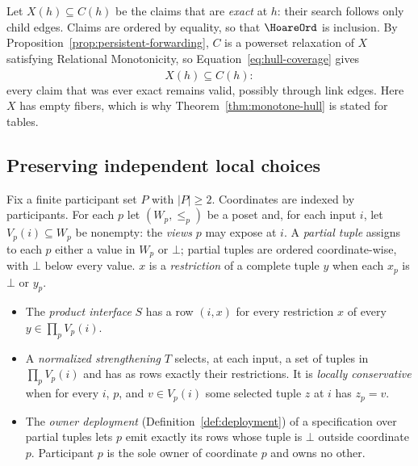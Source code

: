 Let $X(h)\subseteq C(h)$ be the claims that are \emph{exact} at $h$: their
search follows only child edges.  Claims are ordered by equality, so that $\HoareOrd$
is inclusion.  By Proposition~\ref{prop:persistent-forwarding}, $C$ is a
powerset relaxation of $X$ satisfying Relational Monotonicity, so
Equation~\ref{eq:hull-coverage} gives
        \begin{equation}
  \widehat X(h)\subseteq C(h):
  \label{eq:forwarding-hull}
        \end{equation}
every claim that was ever exact remains valid, possibly through link edges.
Here $X$ has empty fibers, which is why Theorem~\ref{thm:monotone-hull} is
stated for tables.

\subsection{Preserving independent local choices}

Fix a finite participant set $P$ with $|P|\ge 2$.  Coordinates are indexed by
participants.  For each $p$ let $(W_p,\le_p)$ be a poset and, for each input
$i$, let $V_p(i)\subseteq W_p$ be nonempty: the \emph{views} $p$ may expose at
$i$.  A \emph{partial tuple} assigns to each $p$ either a value in $W_p$ or
$\bot$; partial tuples are ordered coordinate-wise, with $\bot$ below every
value.  $x$ is a \emph{restriction} of a complete tuple $y$ when each $x_p$ is
$\bot$ or $y_p$.
\begin{itemize}
  \item The \emph{product interface} $S$ has a row $(i,x)$ for every
        restriction $x$ of every $y\in\prod_pV_p(i)$.
  \item A \emph{normalized strengthening} $T$ selects, at each input, a set of
        tuples in $\prod_pV_p(i)$ and has as rows exactly their restrictions.
        It is \emph{locally conservative} when for every $i$, $p$, and $v\in
        V_p(i)$ some selected tuple $z$ at $i$ has $z_p=v$.
  \item The \emph{owner deployment} (Definition~\ref{def:deployment}) of a
        specification over partial tuples lets $p$ emit exactly its rows whose
        tuple is $\bot$ outside coordinate $p$.  Participant $p$ is the sole
        owner of coordinate $p$ and owns no other.
\end{itemize}

